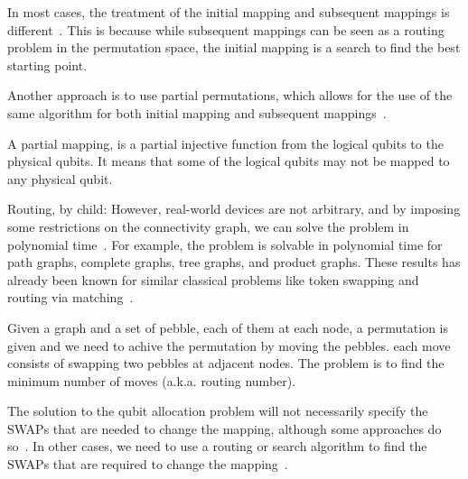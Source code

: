 In most cases, the treatment of the initial mapping and subsequent mappings is different~\cite{zhou2020, li2019}. This is because while subsequent mappings can be seen as a routing problem in the permutation space, the initial mapping is a search to find the best starting point.

Another approach is to use partial permutations, which allows for the use of the same algorithm for both initial mapping and subsequent mappings~\cite{zulehner2018}. %

\begin{definition}
  A partial mapping, is a partial injective function from the logical qubits to the physical qubits.
  It means that some of the logical qubits may not be mapped to any physical qubit.
\end{definition}


Routing, by child:
However, real-world devices are not arbitrary, and by imposing some restrictions on the connectivity graph, we can solve the problem in polynomial time~\cite{childs}. For example, the problem is solvable in polynomial time for path graphs, complete graphs, tree graphs, and product graphs. These results has already been known for similar classical problems like token swapping and routing via matching~\cite{banerjee2017}.

\begin{problem}
  Given a graph and a set of pebble, each of them at each node, a permutation is given and we need to achive the permutation by moving the pebbles. each move consists of swapping two pebbles at adjacent nodes. The problem is to find the minimum number of moves (a.k.a. routing number).
\end{problem}



The solution to the qubit allocation problem will not necessarily specify the SWAPs that are needed to change the mapping, although some approaches do so~\cite{childs, li2019, zhou2020}. In other cases, we need to use a routing or search algorithm to find the SWAPs that are required to change the mapping~\cite{zulehner2018, sivarajah2021}.

